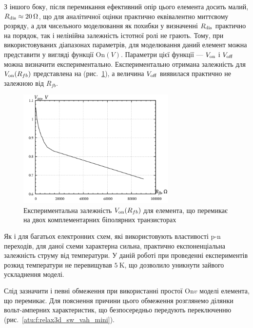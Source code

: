 З іншого боку, після перемикання ефективний опір цього елемента досить малий,
$ R _\mathrm{dis} \approx \SI{20}{\ohm} $, що для аналітичної оцінки практично
еквівалентно миттєвому розряду, а для чисельного моделювання
як похибки у визначенні
$ R _\mathrm{dis} $ практично на порядок, так і нелінійна залежність
істотної ролі не грають. Тому, при використовуваних діапазонах
параметрів, для моделювання даний елемент можна представити
у вигляді функції
$ \mathrm{On} (V) $. Параметри цієї функції ---
$ V _\mathrm{on} $ і
$ V _\mathrm{off} $ можна визначити експериментально. Експериментально
отримана залежність для
$ V _\mathrm{on} (R_{fb}) $ представлена на (рис.~\ref{atu:f:relax3d_bjt_v_onn}), а
величина
$ V _\mathrm{off} $ виявилася практично не залежною від
$ R_{fb} $.

\begin{figure}[htb!]
  \centerline{\includegraphics[width=0.7\textwidth]{p/r_fb-V_on.png} }
\caption{Експериментальна залежність $ V _\mathrm{on} (R_{fb}) $ для елемента, що перемикає на двох комплементарних біполярних транзисторах}
\label{atu:f:relax3d_bjt_v_onn}
\end{figure}

Як і для багатьох електронних схем, які використовують
властивості p-n переходів, для даної схеми характерна сильна,
практично експоненціальна залежність струму від температури. У
даній роботі при проведенні експериментів розкид температури
не перевищував
$ \SI{5}{\kelvin} $, що дозволило уникнути зайвого ускладнення моделі.


Слід зазначити і певні обмеження при використанні простої
$ \mathrm{On}{v} $ моделі елемента, що перемикає. Для пояснення
причини цього обмеження розглянемо ділянки вольт-амперних
характеристик, що безпосередньо передують переключенню
(рис.~\ref{atu:f:relax3d_sw_vah_mini}).


